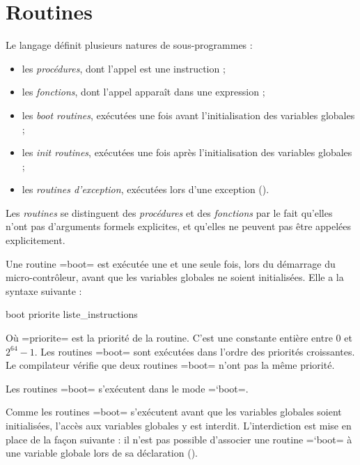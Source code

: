 




\chapter{Routines}

Le langage définit plusieurs natures de sous-programmes :
\begin{itemize}
  \item les \emph{procédures}, dont l'appel est une instruction ;
  \item les \emph{fonctions}, dont l'appel apparaît dans une expression ;
  \item les \emph{boot routines}, exécutées une fois avant l'initialisation des variables globales ;
  \item les \emph{init routines}, exécutées une fois après l'initialisation des variables globales ;
  \item les \emph{routines d'exception}, exécutées lors d'une exception ().
\end{itemize}

Les \emph{routines} se distinguent des \emph{procédures} et des \emph{fonctions} par le fait qu'elles n'ont pas d'arguments formels explicites, et qu'elles ne peuvent pas être appelées explicitement.










Une routine \plm=boot= est exécutée une et une seule fois, lors du démarrage du micro-contrôleur, avant que les variables globales ne soient initialisées. Elle a la syntaxe suivante :
\begin{PLM}
boot priorite {
  liste_instructions
}
\end{PLM}
Où \plm=priorite= est la priorité de la routine. C'est une constante entière entre $0$ et $2^{64}-1$. Les routines \plm=boot= sont exécutées dans l'ordre des priorités croissantes. Le compilateur vérifie que deux routines \plm=boot= n'ont pas la même priorité.

Les routines \plm=boot= s'exécutent dans le mode \plm=`boot=.

Comme les routines \plm=boot= s'exécutent avant que les variables globales soient initialisées, l'accès aux variables globales y est interdit. L'interdiction est mise en place de la façon suivante : il n'est pas possible d'associer une routine \plm=`boot= à une variable globale lors de sa déclaration ().

